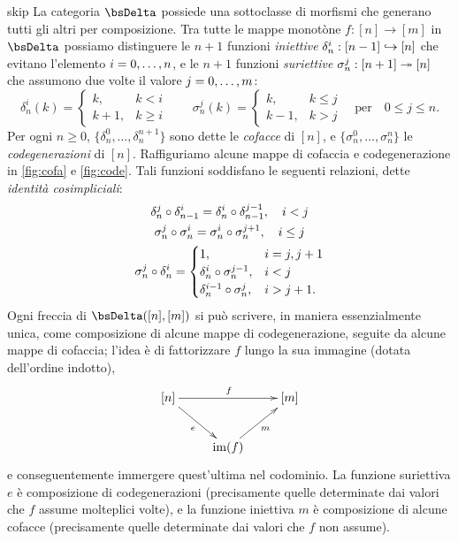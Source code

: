 \begin{hRemark}{skip}\label{rmk_combinatoria_simplessi}
	La categoria \(\bsDelta\) possiede una sottoclasse di morfismi che generano tutti gli altri per composizione. Tra tutte le mappe monotòne \(f : [n]\to [m]\) in \(\bsDelta\) possiamo distinguere le \(n+1\) funzioni \emph{iniettive} \(\delta_n^i : [n-1]\hookrightarrow [n]\) che evitano l'elemento \(i=\iter[0]n\), e le \(n+1\) funzioni \emph{suriettive} \(\sigma_n^j : [n+1]\twoheadrightarrow [n]\) che assumono due volte il valore  \(j=\iter[0]m\):
	\[
		\delta_n^i(k) =
		\begin{cases}
			k,   & k < i    \\
			k+1, & k \geq i
		\end{cases}
		\quad \quad
		\sigma_n^j (k) =
		\begin{cases}
			k,   & k \leq j \\
			k-1, & k > j
		\end{cases}
		\quad \text{per} \quad 0 \leq j\leq n.
	\]
	Per ogni \(n\ge 0\), \(\{\delta_n^0,\dots,\delta_n^{n+1}\}\) sono dette le \emph{cofacce} di \([n]\), e \(\{\sigma_n^0,\dots, \sigma_n^n\}\) le \emph{codegenerazioni} di \([n]\). Raffiguriamo alcune mappe di cofaccia e codegenerazione in \autoref{fig:cofa} e \ref{fig:code}. Tali funzioni soddisfano le seguenti relazioni, dette \emph{identità cosimpliciali}:
	\begin{gather*}
		\delta_n^j \circ \delta_{n-1}^i = \delta_n^i \circ \delta_{n-1}^{j-1}, \quad i < j\\
		\sigma_n^j \circ \sigma_n^i = \sigma_n^i \circ \sigma_n^{j+1}, \quad i \leq j\\
		\sigma_n^j \circ \delta_n^i =
		\begin{cases}
			1,                              & i = j, j+1 \\
			\delta_n^i \circ \sigma_n^{j-1}, & i < j      \\
			\delta_n^{i-1} \circ \sigma_n^j, & i > j+1.
		\end{cases}
	\end{gather*}
	Ogni freccia di \(\Hom\bsDelta([n],[m])\) si può scrivere, in maniera essenzialmente unica, come composizione di alcune mappe di codegenerazione, seguite da alcune mappe di cofaccia; l'idea è di fattorizzare \(f\) lungo la sua immagine (dotata dell'ordine indotto),
	\[\xymatrix{
			[n]\ar[rr]^f\ar[dr]_e &&	[m] \\
			& \im(f) \ar[ur]_m
		}\]
	e conseguentemente immergere quest'ultima nel codominio. La funzione suriettiva \(e\) è composizione di codegenerazioni (precisamente quelle determinate dai valori che \(f\) assume molteplici volte), e la funzione iniettiva \(m\) è composizione di alcune cofacce (precisamente quelle determinate dai valori che \(f\) non assume).
\end{hRemark}
